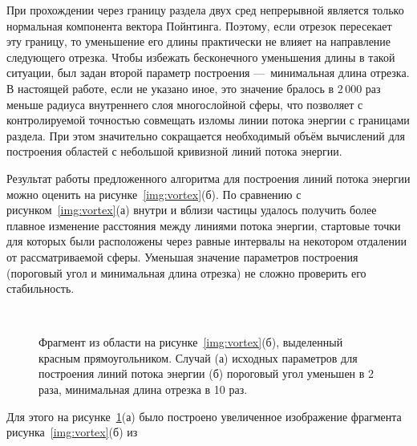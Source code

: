 При прохождении через границу раздела двух сред непрерывной является
только нормальная компонента вектора Пойнтинга. Поэтому, если отрезок
пересекает эту границу, то уменьшение его длины практически не влияет
на направление следующего отрезка. Чтобы избежать бесконечного
уменьшения длины в такой ситуации, был задан второй параметр
построения ---~минимальная длина отрезка.  В настоящей работе, если не
указано иное, это значение бралось в $2\,000$ раз меньше радиуса
внутреннего слоя многослойной сферы, что позволяет с контролируемой
точностью совмещать изломы линии потока энергии с границами
раздела. При этом значительно сокращается необходимый объём вычислений
для построения областей с небольшой кривизной линий потока энергии.

Результат работы предложенного алгоритма для построения линий потока
энергии можно оценить на рисунке~\ref{img:vortex}(б).  По сравнению с
рисунком~\ref{img:vortex}(а) внутри и вблизи частицы удалось получить
более плавное изменение расстояния между линиями потока энергии,
стартовые точки для которых были расположены через равные интервалы на
некотором отдалении от рассматриваемой сферы.  Уменьшая значение параметров
построения (пороговый угол и минимальная длина отрезка) не сложно
проверить его стабильность.
\begin{figure}[t] {\centering
  \begin{minipage}[ht]{0.49\linewidth}        
  \end{minipage}
  \begin{minipage}[ht]{0.49\linewidth}
  \end{minipage}
}\\
{\centering
  \begin{minipage}[ht]{0.49\linewidth}
  \end{minipage}
  \begin{minipage}[ht]{0.49\linewidth}
  \end{minipage}
}
\caption{Фрагмент из области на рисунке~\ref{img:vortex}(б),
  выделенный красным прямоугольником. Случай (а) исходных параметров
  для построения линий потока энергии (б) пороговый угол уменьшен в 2
  раза, минимальная длина отрезка в 10 раз.\label{img:vortex-crop}}
\end{figure}
Для этого на рисунке~\ref{img:vortex-crop}(а) было построено
увеличенное изображение фрагмента рисунка~\ref{img:vortex}(б) из
